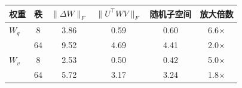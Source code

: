 \begin{tabular}{l c c c c c}
\toprule
权重 & 秩 & $\|\Delta W\|_F$ & $\|U^\top W V\|_F$ & 随机子空间 & 放大倍数 \\
\midrule
$W_q$ & 8 & 3.86 & 0.59 & 0.60 & 6.6$\times$ \\
 & 64 & 9.52 & 4.69 & 4.41 & 2.0$\times$ \\
$W_v$ & 8 & 2.53 & 0.50 & 0.42 & 5.0$\times$ \\
 & 64 & 5.72 & 3.17 & 3.24 & 1.8$\times$ \\
\bottomrule
\end{tabular}